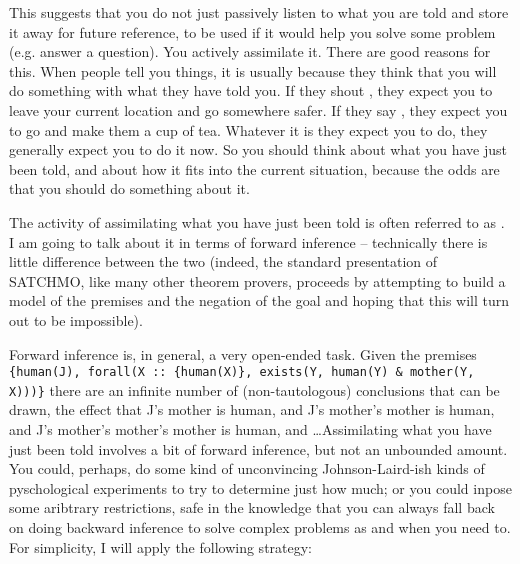 \documentclass[11pt,a4paper]{article}
\begin{document}
This suggests that you do not just passively listen to what you are
told and store it away for future reference, to be used if it would
help you solve some problem (e.g. answer a question). You actively
assimilate it. There are good reasons for this. When people tell you
things, it is usually because they think that you will do something
with what they have told you. If they shout , they expect you
to leave your current location and go somewhere safer. If they say
, they expect you to go and make them a
cup of tea. Whatever it is they expect you to do, they generally
expect you to do it now. So you should think about what you have just
been told, and about how it fits into the current situation, because
the odds are that you should do something about it.

The activity of assimilating what you have just been told is often
referred to as  \citep{Bos:01}. I am going to
talk about it in terms of forward inference -- technically there is
little difference between the two (indeed, the standard presentation
of SATCHMO, like many other
theorem provers, proceeds by attempting to build a model of the
premises and the negation of the goal and hoping that this will turn
out to be impossible).

Forward inference is, in general, a very open-ended task. Given the
premises \texttt{\{human(J), forall(X :: \{human(X)\}, exists(Y,
  human(Y) \& mother(Y, X)))\}} there are an infinite number of
  (non-tautologous) conclusions that can be drawn, the effect that J's
  mother is human, and J's mother's mother is human, and J's mother's
  mother's mother is human, and \ldots Assimilating what you have just
  been told involves a bit of forward inference, but not an unbounded
  amount. You could, perhaps, do some kind of unconvincing
  Johnson-Laird-ish kinds of pyschological experiments to try to
  determine just how much; or you could inpose some aribtrary
  restrictions, safe in the knowledge that you can always fall back on
  doing backward inference to solve complex problems as and when you
  need to. For simplicity, I will apply the following strategy:
\end{document}

